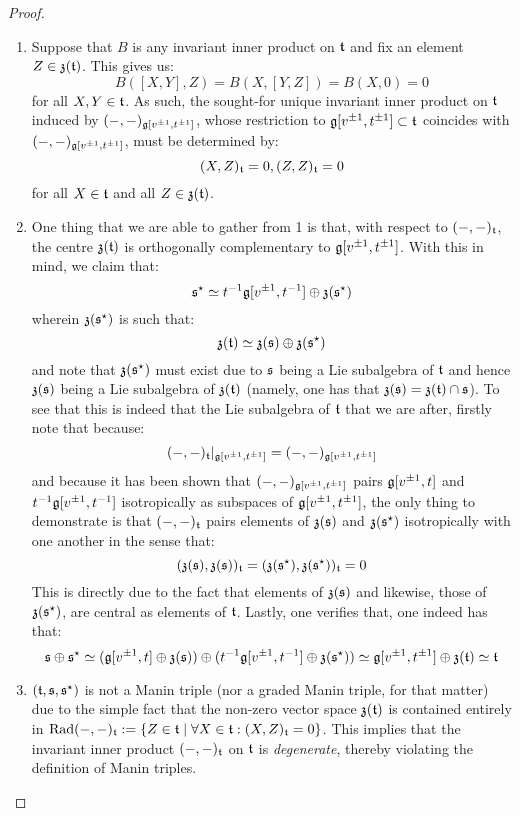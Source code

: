                 \begin{proof}
                    \begin{enumerate}
                        \item Suppose that $B$ is any invariant inner product on $\mathfrak{t}$ and fix an element $Z \in \mathfrak{z}(\mathfrak{t})$. This gives us:
                            $$B([X, Y], Z) = B(X, [Y, Z]) = B(X, 0) = 0$$
                        for all $X, Y \in \mathfrak{t}$. As such, the sought-for unique invariant inner product on $\mathfrak{t}$ induced by $(-, -)_{\mathfrak{g}[v^{\pm 1}, t^{\pm 1}]}$, whose restriction to $\mathfrak{g}[v^{\pm 1}, t^{\pm 1}] \subset \mathfrak{t}$ coincides with $(-, -)_{\mathfrak{g}[v^{\pm 1}, t^{\pm 1}]}$, must be determined by:
                            $$(X, Z)_{\mathfrak{t}} = 0, (Z, Z)_{\mathfrak{t}} = 0$$
                        for all $X \in \mathfrak{t}$ and all $Z \in \mathfrak{z}(\mathfrak{t})$.
                        \item One thing that we are able to gather from 1 is that, with respect to $(-, -)_{\mathfrak{t}}$, the centre $\mathfrak{z}(\mathfrak{t})$ is orthogonally complementary to $\mathfrak{g}[v^{\pm 1}, t^{\pm 1}]$. With this in mind, we claim that:
                            $$\mathfrak{s}^{\star} \simeq t^{-1}\mathfrak{g}[v^{\pm 1}, t^{-1}] \oplus \mathfrak{z}(\mathfrak{s}^{\star})$$
                        wherein $\mathfrak{z}(\mathfrak{s}^{\star})$ is such that:
                            $$\mathfrak{z}(\mathfrak{t}) \simeq \mathfrak{z}(\mathfrak{s}) \oplus \mathfrak{z}(\mathfrak{s}^{\star})$$
                        and note that $\mathfrak{z}(\mathfrak{s}^{\star})$ must exist due to $\mathfrak{s}$ being a Lie subalgebra of $\mathfrak{t}$ and hence $\mathfrak{z}(\mathfrak{s})$ being a Lie subalgebra of $\mathfrak{z}(\mathfrak{t})$ (namely, one has that $\mathfrak{z}(\mathfrak{s}) = \mathfrak{z}(\mathfrak{t}) \cap \mathfrak{s}$). To see that this is indeed that the Lie subalgebra of $\mathfrak{t}$ that we are after, firstly note that because:
                            $$(-, -)_{\mathfrak{t}}|_{\mathfrak{g}[v^{\pm 1}, t^{\pm 1}]} = (-, -)_{\mathfrak{g}[v^{\pm 1}, t^{\pm 1}]}$$
                        and because it has been shown that $(-, -)_{\mathfrak{g}[v^{\pm 1}, t^{\pm 1}]}$ pairs $\mathfrak{g}[v^{\pm 1}, t]$ and $t^{-1}\mathfrak{g}[v^{\pm 1}, t^{-1}]$ isotropically as subspaces of $\mathfrak{g}[v^{\pm 1}, t^{\pm 1}]$, the only thing to demonstrate is that $(-, -)_{\mathfrak{t}}$ pairs elements of $\mathfrak{z}(\mathfrak{s})$ and $\mathfrak{z}(\mathfrak{s}^{\star})$ isotropically with one another in the sense that:
                            $$(\mathfrak{z}(\mathfrak{s}), \mathfrak{z}(\mathfrak{s}))_{\mathfrak{t}} = (\mathfrak{z}(\mathfrak{s}^{\star}), \mathfrak{z}(\mathfrak{s}^{\star}))_{\mathfrak{t}} = 0$$
                        This is directly due to the fact that elements of $\mathfrak{z}(\mathfrak{s})$ and likewise, those of $\mathfrak{z}(\mathfrak{s}^{\star})$, are central as elements of $\mathfrak{t}$. Lastly, one verifies that, one indeed has that:
                            $$\mathfrak{s} \oplus \mathfrak{s}^{\star} \simeq ( \mathfrak{g}[v^{\pm 1}, t] \oplus \mathfrak{z}(\mathfrak{s}) ) \oplus ( t^{-1}\mathfrak{g}[v^{\pm 1}, t^{-1}] \oplus \mathfrak{z}(\mathfrak{s}^{\star}) ) \simeq \mathfrak{g}[v^{\pm 1}, t^{\pm 1}] \oplus \mathfrak{z}(\mathfrak{t}) \simeq \mathfrak{t}$$
                        \item $(\mathfrak{t}, \mathfrak{s}, \mathfrak{s}^{\star})$ is not a Manin triple (nor a graded Manin triple, for that matter) due to the simple fact that the non-zero vector space $\mathfrak{z}(\mathfrak{t})$ is contained entirely in $\operatorname{Rad} (-, -)_{\mathfrak{t}} := \{Z \in \mathfrak{t} \mid \forall X \in \mathfrak{t}: (X, Z)_{\mathfrak{t}} = 0\}$. This implies that the invariant inner product $(-, -)_{\mathfrak{t}}$ on $\mathfrak{t}$ is \textit{degenerate}, thereby violating the definition of Manin triples. 
                    \end{enumerate}
                \end{proof}
